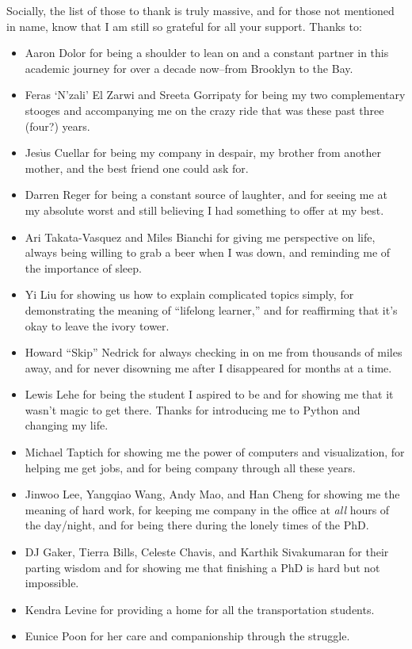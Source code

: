 \documentclass{ucbthesis}
\begin{document}
\begin{frontmatter}
\begin{acknowledgements}
Socially, the list of those to thank is truly massive, and for those not mentioned in name, know that I am still so grateful for all your support. Thanks to: \begin{itemize}
\item Aaron Dolor for being a shoulder to lean on and a constant partner in this academic journey for over a decade now--from Brooklyn to the Bay.
\item Feras `N'zali' El Zarwi and Sreeta Gorripaty for being my two complementary stooges and accompanying me on the crazy ride that was these past three (four?) years.
\item Jes$\grave{\textrm{u}}$s Cuellar for being my company in despair, my brother from another mother, and the best friend one could ask for.
\item Darren Reger for being a constant source of laughter, and for seeing me at my absolute worst and still believing I had something to offer at my best.
\item Ari Takata-Vasquez and Miles Bianchi for giving me perspective on life, always being willing to grab a beer when I was down, and reminding me of the importance of sleep.
\item Yi Liu for showing us how to explain complicated topics simply, for demonstrating the meaning of ``lifelong learner,'' and for reaffirming that it's okay to leave the ivory tower.
\item Howard ``Skip'' Nedrick for always checking in on me from thousands of miles away, and for never disowning me after I disappeared for months at a time.
\item Lewis Lehe for being the student I aspired to be and for showing me that it wasn't magic to get there. Thanks for introducing me to Python and changing my life.
\item Michael Taptich for showing me the power of computers and visualization, for helping me get jobs, and for being company through all these years.
\item Jinwoo Lee, Yangqiao Wang, Andy Mao, and Han Cheng for showing me the meaning of hard work, for keeping me company in the office at \textit{all} hours of the day/night, and for being there during the lonely times of the PhD.
\item DJ Gaker, Tierra Bills, Celeste Chavis, and Karthik Sivakumaran for their parting wisdom and for showing me that finishing a PhD is hard but not impossible.
\item Kendra Levine for providing a home for all the transportation students.
\item Eunice Poon for her care and companionship through the struggle.
\end{itemize}


\end{acknowledgements}
\end{frontmatter}
\end{document}
